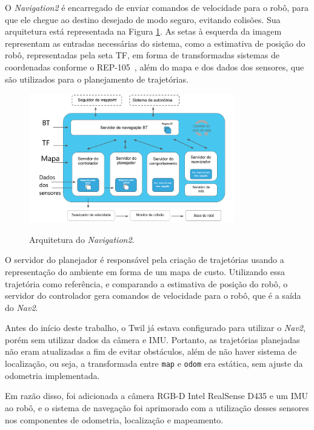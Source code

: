 \documentclass[repeatfields,xlists,xpacks,oneside,yearsonly]{ufrgscca}
\begin{document}
O \textit{Navigation2} é encarregado de enviar comandos de velocidade
para o robô, para que ele chegue ao destino desejado de modo seguro,
evitando colisões. Sua arquitetura está representada na Figura
\ref{fig:nav2_arc}. As setas à esquerda da imagem representam as
entradas necessárias do sistema, como a estimativa de posição do
robô, representadas pela seta TF, em forma de transformadas sistemas
de coordenadas conforme o REP-105~\cite{rep_105}, além do mapa e dos
dados dos sensores, que são utilizados para o planejamento de
trajetórias.

\begin{figure}[H]
    {
        \centering
        \caption{Arquitetura do \textit{Navigation2}.}
        \label{fig:nav2_arc}
        \includegraphics[width=0.8\textwidth]{nav2_architecture_trad.png}\\
    }
    {}
\end{figure}

O servidor do planejador é responsável pela criação de trajetórias
usando a representação do ambiente em forma de um mapa de custo.
Utilizando essa trajetória como referência, e comparando a estimativa
de posição do robô, o servidor do controlador gera comandos de
velocidade para o robô, que é a saída do \textit{Nav2}.

Antes do início deste trabalho, o Twil já estava configurado para
utilizar o \textit{Nav2}, porém sem utilizar dados da câmera e IMU.
Portanto, as trajetórias planejadas não eram atualizadas a fim de
evitar obstáculos, além de não haver sistema de localização, ou seja,
a transformada entre \texttt{map} e \texttt{odom} era estática, sem
ajuste da odometria implementada.

Em razão disso, foi adicionada a câmera RGB-D Intel RealSense D435 e
um IMU ao robô, e o sistema de navegação foi aprimorado com a
utilização desses sensores nos componentes de odometria, localização
e mapeamento.
\end{document}
